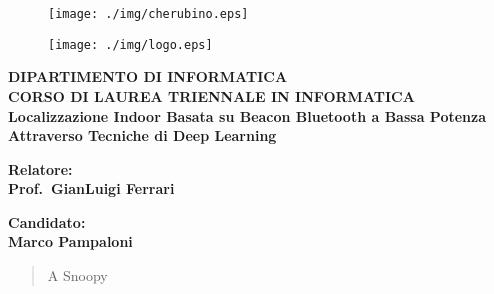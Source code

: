 \documentclass[12pt, twoside, openright]{report}
\newcommand\blankpage{%
  \null%
  \thispagestyle{empty}%
  \newpage
}
\newenvironment{dedication}
{\vspace*{50ex}\begin{quotation}\begin{center}\begin{em}}
      {\par\end{em}\end{center}\end{quotation}}
\begin{document}
\begin{titlepage}
  \begin{figure}[t]
    \centering\texttt{[image: ./img/cherubino.eps]}

    \vspace{0.5cm}
    \centering\texttt{[image: ./img/logo.eps]}
  \end{figure}

  \begin{center}
    \textbf{ DIPARTIMENTO DI INFORMATICA\\ CORSO DI LAUREA TRIENNALE IN INFORMATICA\\}
    \vspace{15mm}
    {\LARGE{\bf Localizzazione Indoor Basata su Beacon Bluetooth a Bassa Potenza
        Attraverso Tecniche di Deep Learning}}\\
  \end{center}

  \vspace{20mm}

  \begin{minipage}[t]{0.47\textwidth}
    {\large{\bf Relatore:\\ Prof.\ GianLuigi Ferrari 
      }}
  \end{minipage}\hfill
  \begin{minipage}[t]{0.47\textwidth}\raggedleft
    {\large{\bf Candidato: \\ Marco Pampaloni}}
  \end{minipage}

  \vfill



\end{titlepage}

\blankpage

\begin{abstract}
  
\end{abstract}

\blankpage

\clearpage
\begin{dedication}
  \thispagestyle{empty}
  A Snoopy
\end{dedication}
\clearpage

\blankpage
\end{document}
